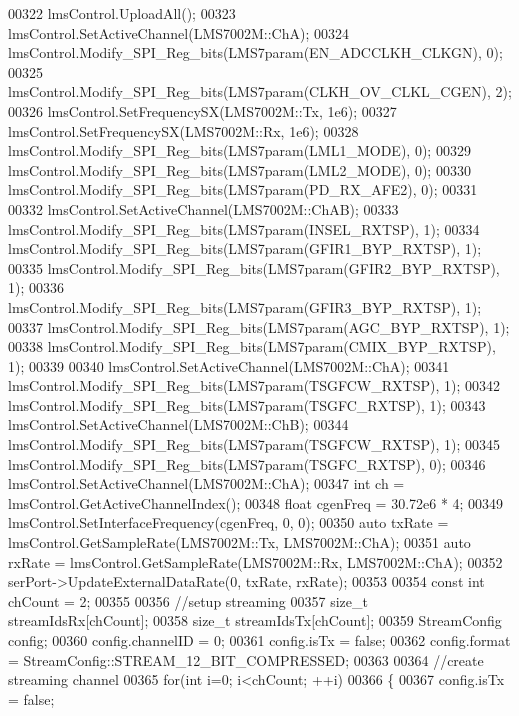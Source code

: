 \begin{DoxyCode}
{{{00322     lmsControl.UploadAll();
00323     lmsControl.SetActiveChannel(LMS7002M::ChA);
00324     lmsControl.Modify_SPI_Reg_bits(LMS7param(EN_ADCCLKH_CLKGN), 0);
00325     lmsControl.Modify_SPI_Reg_bits(LMS7param(CLKH_OV_CLKL_CGEN), 2);
00326     lmsControl.SetFrequencySX(LMS7002M::Tx, 1e6);
00327     lmsControl.SetFrequencySX(LMS7002M::Rx, 1e6);
00328     lmsControl.Modify_SPI_Reg_bits(LMS7param(LML1_MODE), 0);
00329     lmsControl.Modify_SPI_Reg_bits(LMS7param(LML2_MODE), 0);
00330     lmsControl.Modify_SPI_Reg_bits(LMS7param(PD_RX_AFE2), 0);
00331 
00332     lmsControl.SetActiveChannel(LMS7002M::ChAB);
00333     lmsControl.Modify_SPI_Reg_bits(LMS7param(INSEL_RXTSP), 1);
00334     lmsControl.Modify_SPI_Reg_bits(LMS7param(GFIR1_BYP_RXTSP), 1);
00335     lmsControl.Modify_SPI_Reg_bits(LMS7param(GFIR2_BYP_RXTSP), 1);
00336     lmsControl.Modify_SPI_Reg_bits(LMS7param(GFIR3_BYP_RXTSP), 1);
00337     lmsControl.Modify_SPI_Reg_bits(LMS7param(AGC_BYP_RXTSP), 1);
00338     lmsControl.Modify_SPI_Reg_bits(LMS7param(CMIX_BYP_RXTSP), 1);
00339 
00340     lmsControl.SetActiveChannel(LMS7002M::ChA);
00341     lmsControl.Modify_SPI_Reg_bits(LMS7param(TSGFCW_RXTSP), 1);
00342     lmsControl.Modify_SPI_Reg_bits(LMS7param(TSGFC_RXTSP), 1);
00343     lmsControl.SetActiveChannel(LMS7002M::ChB);
00344     lmsControl.Modify_SPI_Reg_bits(LMS7param(TSGFCW_RXTSP), 1);
00345     lmsControl.Modify_SPI_Reg_bits(LMS7param(TSGFC_RXTSP), 0);
00346     lmsControl.SetActiveChannel(LMS7002M::ChA);
00347     \textcolor{keywordtype}{int} ch = lmsControl.GetActiveChannelIndex();
00348     \textcolor{keywordtype}{float} cgenFreq = 30.72e6 * 4;
00349     lmsControl.SetInterfaceFrequency(cgenFreq, 0, 0);
00350     \textcolor{keyword}{auto} txRate = lmsControl.GetSampleRate(LMS7002M::Tx, LMS7002M::ChA);
00351     \textcolor{keyword}{auto} rxRate = lmsControl.GetSampleRate(LMS7002M::Rx, LMS7002M::ChA);
00352     serPort->UpdateExternalDataRate(0, txRate, rxRate);
00353 
00354     \textcolor{keyword}{const} \textcolor{keywordtype}{int} chCount = 2;
00355 
00356     \textcolor{comment}{//setup streaming}
00357     \textcolor{keywordtype}{size\_t} streamIdsRx[chCount];
00358     \textcolor{keywordtype}{size\_t} streamIdsTx[chCount];
00359     StreamConfig config;
00360     config.channelID = 0;
00361     config.isTx = \textcolor{keyword}{false};
00362     config.format = StreamConfig::STREAM\_12\_BIT\_COMPRESSED;
00363 
00364     \textcolor{comment}{//create streaming channel}
00365     \textcolor{keywordflow}{for}(\textcolor{keywordtype}{int} i=0; i<chCount; ++i)
00366     \{
00367         config.isTx = \textcolor{keyword}{false};
}}}
\end{DoxyCode}
